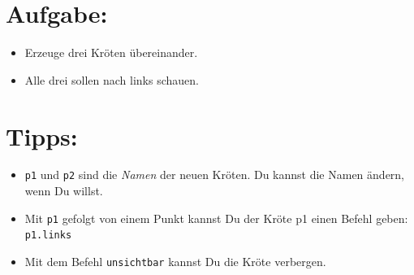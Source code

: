 \section*{\color{BrickRed}Aufgabe:}


\begin{itemize}

\item {Erzeuge drei Kröten übereinander.}
\item {Alle drei sollen nach links schauen.}

\end{itemize}


\section*{\color{OliveGreen}Tipps:}


\begin{itemize}

\item {\lstinline{p1} und \lstinline{p2} sind die {\it Namen} der neuen Kröten. Du kannst die Namen ändern, wenn Du willst.}
\item {Mit \lstinline{p1} gefolgt von einem Punkt kannst Du der Kröte p1 einen Befehl geben: \lstinline{p1.links}}
\item {Mit dem Befehl \lstinline{unsichtbar} kannst Du die Kröte verbergen.}

\end{itemize}


